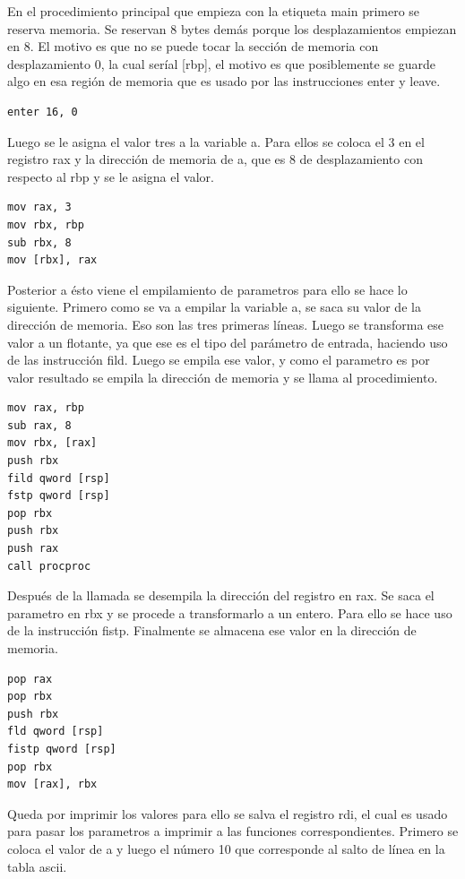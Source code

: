 \documentclass[11pt, spanish]{report}
\begin{document}
En el procedimiento principal que empieza con la etiqueta main primero se reserva memoria. Se reservan 8 
bytes dem\'as porque los desplazamientos empiezan en 8. El motivo es que no se puede tocar la secci\'on 
de memoria con desplazamiento 0, la cual ser\'ial [rbp], el motivo es que posiblemente se guarde algo
en esa regi\'on de memoria que es usado por las instrucciones enter y leave.\\

\begin{verbatim}
enter 16, 0
\end{verbatim}

Luego se le asigna el valor tres a la variable a. Para ellos se coloca el 3 en el registro rax y la direcci\'on
de memoria de a, que es 8 de desplazamiento con respecto al rbp y se le asigna el valor.\\

\begin{verbatim}
mov rax, 3
mov rbx, rbp
sub rbx, 8
mov [rbx], rax
\end{verbatim}

Posterior a \'esto viene el empilamiento de parametros para ello se hace lo siguiente. Primero como
se va a empilar la variable a, se saca su valor de la direcci\'on de memoria. Eso son las tres
primeras l\'ineas. Luego se transforma ese valor a un flotante, ya que ese es el tipo del par\'ametro de entrada, haciendo uso de las instrucci\'on
fild. Luego se empila ese valor, y como el parametro es por valor resultado se empila la direcci\'on de memoria y se llama al procedimiento.\\

\begin{verbatim}
mov rax, rbp
sub rax, 8
mov rbx, [rax]
push rbx
fild qword [rsp]
fstp qword [rsp]
pop rbx
push rbx
push rax
call procproc
\end{verbatim}

Despu\'es de la llamada se desempila la direcci\'on del registro en rax. Se saca el parametro en rbx y se procede a transformarlo a un entero.
Para ello se hace uso de la instrucci\'on fistp. Finalmente se almacena ese valor en la direcci\'on de memoria.\\

\begin{verbatim}
pop rax
pop rbx
push rbx
fld qword [rsp]
fistp qword [rsp]
pop rbx
mov [rax], rbx
\end{verbatim}

Queda por imprimir los valores para ello se salva el registro rdi, el cual es usado para pasar los parametros a imprimir a las funciones
correspondientes. Primero se coloca el valor de a y luego el n\'umero 10 que corresponde al salto de l\'inea en la tabla ascii.
\end{document}
